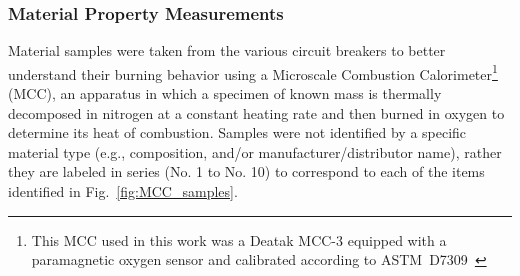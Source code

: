 \subsubsection{Material Property Measurements}
\label{ssec:MCC}
Material samples were taken from the various circuit breakers to better understand their burning behavior using a Microscale Combustion Calorimeter\footnote{This MCC used in this work was a Deatak MCC-3 equipped with a paramagnetic oxygen sensor and calibrated according to ASTM~D7309~\cite{ASTMD7309}} (MCC), an apparatus in which a specimen of known mass is thermally decomposed in nitrogen at a constant heating rate and then burned in oxygen to determine its heat of combustion. Samples were not identified by a specific material type (e.g., composition, and/or manufacturer/distributor name), rather they are labeled in series (No. 1 to No. 10) to correspond to each of the items identified in Fig.~\ref{fig:MCC_samples}.


